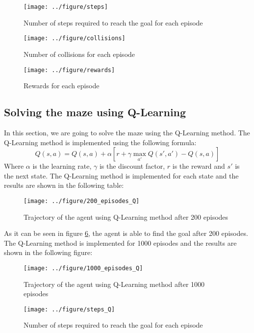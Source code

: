 \documentclass{article}
\begin{document}
	\begin{figure}[H]
		\centering
		\texttt{[image: ../figure/steps]}
		\caption{Number of steps required to reach the goal for each episode}
		\label{fig:sarsa}
	\end{figure}

	\begin{figure}[H]
		\centering
		\texttt{[image: ../figure/collisions]}
		\caption{Number of collisions for each episode}
		\label{fig:sarsa}
	\end{figure}

	\begin{figure}[H]
		\centering
		\texttt{[image: ../figure/rewards]}
		\caption{Rewards for each episode}
		\label{fig:sarsa}
	\end{figure}

	\subsection{Solving the maze using Q-Learning}
	In this section, we are going to solve the maze using the Q-Learning method. The Q-Learning method is implemented using the following formula:
	\begin{equation}
		Q(s,a) = Q(s,a) + \alpha [r + \gamma \max_{a'} Q(s',a') - Q(s,a)]
	\end{equation}
	Where $\alpha$ is the learning rate, $\gamma$ is the discount factor, $r$ is the reward and $s'$ is the next state. The Q-Learning method is implemented for each state and the results are shown in the following table:
	\begin{figure}[H]
		\centering
		\texttt{[image: ../figure/200\_episodes\_Q]}
		\caption{Trajectory of the agent using Q-Learning method after 200 episodes}
		\label{fig:sarsa}
	\end{figure}
	As it can be seen in figure \ref{fig:sarsa}, the agent is able to find the goal after 200 episodes. The Q-Learning method is implemented for 1000 episodes and the results are shown in the following figure:
	\begin{figure}[H]
		\centering
		\texttt{[image: ../figure/1000\_episodes\_Q]}
		\caption{Trajectory of the agent using Q-Learning method after 1000 episodes}
		\label{fig:sarsa}
	\end{figure}

	\begin{figure}[H]
		\centering
		\texttt{[image: ../figure/steps\_Q]}
		\caption{Number of steps required to reach the goal for each episode}
		\label{fig:sarsa}
	\end{figure}
\end{document}
